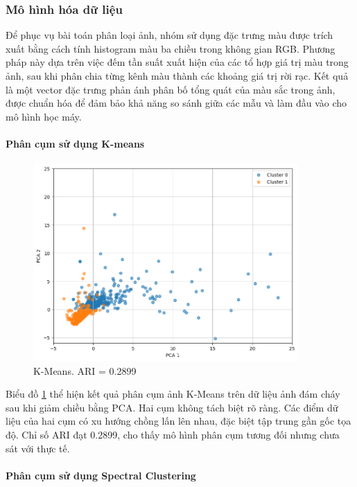 \subsubsection{Mô hình hóa dữ liệu}
    Để phục vụ bài toán phân loại ảnh, nhóm sử dụng đặc trưng màu được trích xuất bằng cách tính histogram màu ba chiều trong không gian RGB. Phương pháp này dựa trên việc đếm tần suất xuất hiện của các tổ hợp giá trị màu trong ảnh, sau khi phân chia từng kênh màu thành các khoảng giá trị rời rạc. Kết quả là một vector đặc trưng phản ánh phân bố tổng quát của màu sắc trong ảnh, được chuẩn hóa để đảm bảo khả năng so sánh giữa các mẫu và làm đầu vào cho mô hình học máy.

    \paragraph{Phân cụm sử dụng K-means}
    \leavevmode

    \begin{figure}[htp]
        \centering
        \includegraphics[width=0.90\textwidth]{images/Img_fire_kmeans.png}
        \caption{K-Means. ARI = 0.2899}
        \label{fig:Img_fire_kmeans}
    \end{figure}
    \FloatBarrier

    Biểu đồ \ref{fig:Img_fire_kmeans} thể hiện kết quả phân cụm ảnh K-Means trên dữ liệu ảnh đám cháy sau khi giảm chiều bằng PCA. Hai cụm không tách biệt rõ ràng. Các điểm dữ liệu của hai cụm có xu hướng chồng lấn lên nhau, đặc biệt tập trung gần gốc tọa độ. Chỉ số ARI đạt 0.2899, cho thấy mô hình phân cụm tương đối nhưng chưa sát với thực tế.
    

    \paragraph{Phân cụm sử dụng Spectral Clustering}
    \leavevmode

